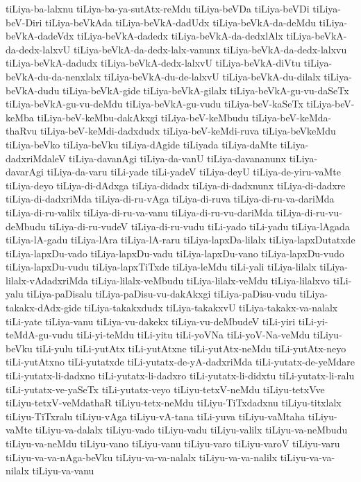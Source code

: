 {tiLiya-ba-lalxnu
tiLiya-ba-ya-sutAtx-reMdu
tiLiya-beVDa
tiLiya-beVDi
tiLiya-beV-Diri
tiLiya-beVkAda
tiLiya-beVkA-dadUdx
tiLiya-beVkA-da-deMdu
tiLiya-beVkA-dadeVdx
tiLiya-beVkA-dadedx
tiLiya-beVkA-da-dedxlAlx
tiLiya-beVkA-da-dedx-lalxvU
tiLiya-beVkA-da-dedx-lalx-vanunx
tiLiya-beVkA-da-dedx-lalxvu
tiLiya-beVkA-dadudx
tiLiya-beVkA-dedx-lalxvU
tiLiya-beVkA-diVtu
tiLiya-beVkA-du-da-nenxlalx
tiLiya-beVkA-du-de-lalxvU
tiLiya-beVkA-du-dilalx
tiLiya-beVkA-dudu
tiLiya-beVkA-gide
tiLiya-beVkA-gilalx
tiLiya-beVkA-gu-vu-daSeTx
tiLiya-beVkA-gu-vu-deMdu
tiLiya-beVkA-gu-vudu
tiLiya-beV-kaSeTx
tiLiya-beV-keMba
tiLiya-beV-keMbu-dakAkxgi
tiLiya-beV-keMbudu
tiLiya-beV-keMda-thaRvu
tiLiya-beV-keMdi-dadxdudx
tiLiya-beV-keMdi-ruva
tiLiya-beVkeMdu
tiLiya-beVko
tiLiya-beVku
tiLiya-dAgide
tiLiyada
tiLiya-daMte
tiLiya-dadxriMdaleV
tiLiya-davanAgi
tiLiya-da-vanU
tiLiya-davananunx
tiLiya-davarAgi
tiLiya-da-varu
tiLi-yade
tiLi-yadeV
tiLiya-deyU
tiLiya-de-yiru-vaMte
tiLiya-deyo
tiLiya-di-dAdxga
tiLiya-didadx
tiLiya-di-dadxnunx
tiLiya-di-dadxre
tiLiya-di-dadxriMda
tiLiya-di-ru-vAga
tiLiya-di-ruva
tiLiya-di-ru-va-dariMda
tiLiya-di-ru-valilx
tiLiya-di-ru-va-vanu
tiLiya-di-ru-vu-dariMda
tiLiya-di-ru-vu-deMbudu
tiLiya-di-ru-vudeV
tiLiya-di-ru-vudu
tiLi-yado
tiLi-yadu
tiLiya-lAgada
tiLiya-lA-gadu
tiLiya-lAra
tiLiya-lA-raru
tiLiya-lapxDa-lilalx
tiLiya-lapxDutatxde
tiLiya-lapxDu-vado
tiLiya-lapxDu-vadu
tiLiya-lapxDu-vano
tiLiya-lapxDu-vudo
tiLiya-lapxDu-vudu
tiLiya-lapxTiTxde
tiLiya-leMdu
tiLi-yali
tiLiya-lilalx
tiLiya-lilalx-vAdadxriMda
tiLiya-lilalx-veMbudu
tiLiya-lilalx-veMdu
tiLiya-lilalxvo
tiLi-yalu
tiLiya-paDisalu
tiLiya-paDisu-vu-dakAkxgi
tiLiya-paDisu-vudu
tiLiya-takakx-dAdx-gide
tiLiya-takakxdudx
tiLiya-takakxvU
tiLiya-takakx-va-nalalx
tiLi-yate
tiLiya-vanu
tiLiya-vu-dakekx
tiLiya-vu-deMbudeV
tiLi-yiri
tiLi-yi-teMdA-gu-vudu
tiLi-yi-teMdu
tiLi-yitu
tiLi-yoVNa
tiLi-yoV-Na-veMdu
tiLiyu-beVku
tiLi-yulu
tiLi-yutAtx
tiLi-yutAtxne
tiLi-yutAtx-neMdu
tiLi-yutAtx-neyo
tiLi-yutAtxno
tiLi-yutatxde
tiLi-yutatx-de-yA-dadxriMda
tiLi-yutatx-de-yeMdare
tiLi-yutatx-li-dadxno
tiLi-yutatx-li-dadxro
tiLi-yutatx-li-didxtu
tiLi-yutatx-li-ralu
tiLi-yutatx-ve-yaSeTx
tiLi-yutatx-veyo
tiLiyu-tetxV-neMdu
tiLiyu-tetxVve
tiLiyu-tetxV-veMdathaR
tiLiyu-tetx-neMdu
tiLiyu-TiTxdadxnu
tiLiyu-titxlalx
tiLiyu-TiTxralu
tiLiyu-vAga
tiLiyu-vA-tana
tiLi-yuva
tiLiyu-vaMtaha
tiLiyu-vaMte
tiLiyu-va-dalalx
tiLiyu-vado
tiLiyu-vadu
tiLiyu-valilx
tiLiyu-va-neMbudu
tiLiyu-va-neMdu
tiLiyu-vano
tiLiyu-vanu
tiLiyu-varo
tiLiyu-varoV
tiLiyu-varu
tiLiyu-va-va-nAga-beVku
tiLiyu-va-va-nalalx
tiLiyu-va-va-nalilx
tiLiyu-va-va-nilalx
tiLiyu-va-vanu
}
